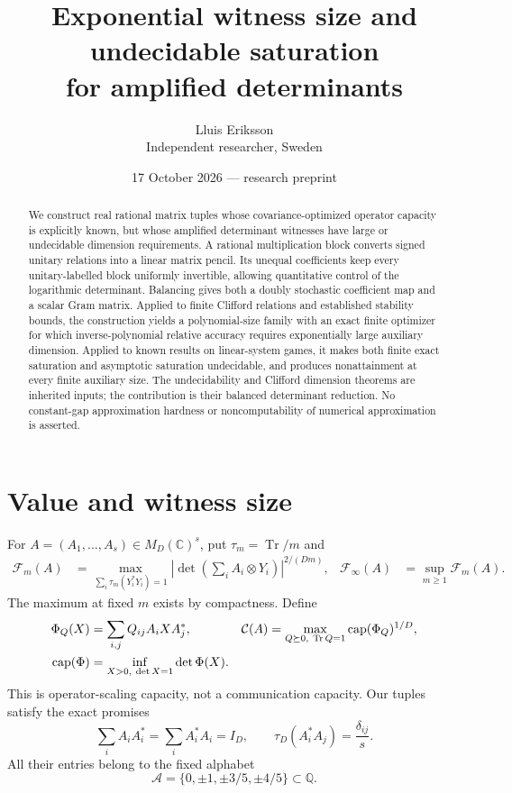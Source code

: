 \documentclass[11pt]{article}
\title{Exponential witness size and undecidable saturation\\for amplified determinants}
\author{Lluis Eriksson\\Independent researcher, Sweden}
\date{17 October 2026 --- research preprint}
\newcommand{\C}{\mathbb C}
\newcommand{\Q}{\mathbb Q}
\newcommand{\Tr}{\operatorname{Tr}}
\newcommand{\F}{\mathcal F}
\newcommand{\K}{\mathcal C}
\newcommand{\capop}{\operatorname{cap}}
\begin{document}
\maketitle
\begin{abstract}
We construct real rational matrix tuples whose covariance-optimized operator capacity is explicitly known, but whose amplified determinant witnesses have large or undecidable dimension requirements. A rational multiplication block converts signed unitary relations into a linear matrix pencil. Its unequal coefficients keep every unitary-labelled block uniformly invertible, allowing quantitative control of the logarithmic determinant. Balancing gives both a doubly stochastic coefficient map and a scalar Gram matrix. Applied to finite Clifford relations and established stability bounds, the construction yields a polynomial-size family with an exact finite optimizer for which inverse-polynomial relative accuracy requires exponentially large auxiliary dimension. Applied to known results on linear-system games, it makes both finite exact saturation and asymptotic saturation undecidable, and produces nonattainment at every finite auxiliary size. The undecidability and Clifford dimension theorems are inherited inputs; the contribution is their balanced determinant reduction. No constant-gap approximation hardness or noncomputability of numerical approximation is asserted.
\end{abstract}

\section{Value and witness size}
For $A=(A_1,\ldots,A_s)\in M_D(\C)^s$, put $\tau_m=\Tr/m$ and
\begin{align}
 \F_m(A)&=\max_{\sum_i\tau_m(Y_i^*Y_i)=1}
 \left|\det\left(\sum_i A_i\otimes Y_i\right)\right|^{2/(Dm)},
 &\F_\infty(A)&=\sup_{m\ge1}\F_m(A). \label{eq:F}
\end{align}
The maximum at fixed $m$ exists by compactness. Define
\begin{align}
 \Phi_Q(X)&=\sum_{i,j}Q_{ij}A_iXA_j^*,&
 \K(A)&=\max_{Q\succeq0,\ \Tr Q=1}\capop(\Phi_Q)^{1/D}, \label{eq:C}\\
 \capop(\Phi)&=\inf_{X>0,\ \det X=1}\det\Phi(X). \notag
\end{align}
This is operator-scaling capacity, not a communication capacity. Our tuples satisfy the exact promises
\begin{equation}
 \sum_iA_iA_i^*=\sum_iA_i^*A_i=I_D,\qquad
 \tau_D(A_i^*A_j)=\frac{\delta_{ij}}s. \label{eq:balanced}
\end{equation}
All their entries belong to the fixed alphabet
\[
 \mathcal A=\{0,\pm1,\pm3/5,\pm4/5\}\subset\Q.
\]
\end{document}
